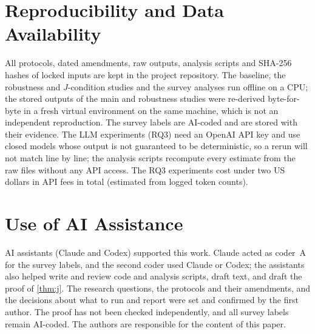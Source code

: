 \section*{Reproducibility and Data Availability}

All protocols, dated amendments, raw outputs, analysis scripts and SHA-256 hashes of locked inputs are kept in the project repository. The baseline, the robustness and $J$-condition studies and the survey analyses run offline on a CPU; the stored outputs of the main and robustness studies were re-derived byte-for-byte in a fresh virtual environment on the same machine, which is not an independent reproduction. The survey labels are AI-coded and are stored with their  evidence. The LLM experiments (RQ3) need an OpenAI API key and use closed models whose output is not guaranteed to be deterministic, so a rerun will not match line by line; the analysis scripts recompute every estimate from the raw files without any API access. The RQ3 experiments cost under two US dollars in API fees in total (estimated from logged token counts).

\section*{Use of AI Assistance}

AI assistants (Claude and Codex) supported this work. Claude acted as coder~A for the survey labels, and the second coder used Claude or Codex; the assistants also helped write and review code and analysis scripts, draft text, and draft the proof of \cref{thm:j}. The research questions, the protocols and their amendments, and the decisions about what to run and report were set and confirmed by the first author. The proof has not been checked independently, and all survey labels remain AI-coded. The authors are responsible for the content of this paper.
